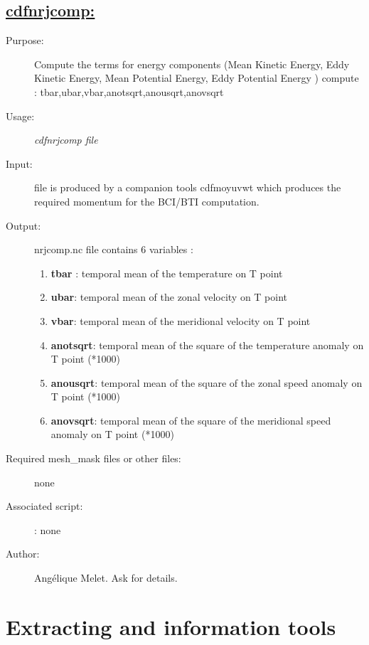 \documentclass[a4paper,11pt]{article}
\begin{document}
\subsection*{\underline{cdfnrjcomp:}}
\begin{description}
\item[Purpose:] Compute the terms for energy components
               (Mean Kinetic Energy, Eddy Kinetic Energy,
                Mean Potential Energy, Eddy Potential Energy )
               compute : tbar,ubar,vbar,anotsqrt,anousqrt,anovsqrt
\item[Usage:] {\em cdfnrjcomp  file } 
\item[Input:] file is produced by a companion tools cdfmoyuvwt which produces the required momentum for the BCI/BTI computation.
\item[Output:] nrjcomp.nc file contains 6 variables : 
     \begin{enumerate} 
        \item {\bf tbar} : temporal mean of the temperature on T point
        \item {\bf ubar}: temporal mean of the zonal velocity on T point
        \item {\bf vbar}: temporal mean of the meridional velocity on T point
        \item {\bf anotsqrt}: temporal mean of the square of the temperature anomaly on T point (*1000)
        \item {\bf anousqrt}: temporal mean of the square of the zonal speed anomaly on T point (*1000)
        \item {\bf anovsqrt}: temporal mean of the square of the meridional speed anomaly on T point (*1000)
      \end{enumerate}
\item[Required mesh\_mask files or other files:] none
\item[Associated script:] : none
\item[Author:] Ang\'elique Melet. Ask for details.
\end{description}



\newpage
\section{Extracting and information tools}
\end{document}
